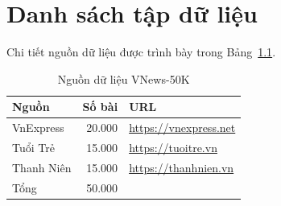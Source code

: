 \documentclass[12pt, a4paper]{report}
\begin{document}
\chapter{Danh sách tập dữ liệu}
\label{app:dataset}

Chi tiết nguồn dữ liệu được trình bày trong Bảng~\ref{tab:data-sources}.

\begin{table}[htbp]
  \centering
  \caption{Nguồn dữ liệu VNews-50K}
  \label{tab:data-sources}
  \begin{tabular}{lrl}
    \toprule
    Nguồn & Số bài & URL \\
    \midrule
    VnExpress  & 20.000 & \url{https://vnexpress.net} \\
    Tuổi Trẻ   & 15.000 & \url{https://tuoitre.vn} \\
    Thanh Niên & 15.000 & \url{https://thanhnien.vn} \\
    \midrule
    Tổng       & 50.000 & \\
    \bottomrule
  \end{tabular}
\end{table}
\end{document}

